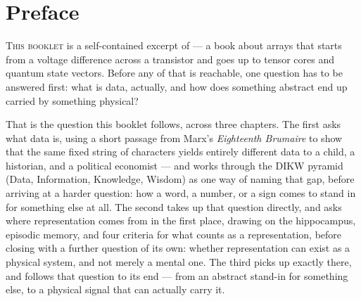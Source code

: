 \chapter*{Preface}

\lettrine{T}{his booklet} is a self-contained excerpt of \BookletSubtitle
--- a book about arrays that starts from a voltage difference across a
transistor and goes up to tensor cores and quantum state vectors. Before
any of that is reachable, one question has to be answered first: what is
data, actually, and how does something abstract end up carried by
something physical?

That is the question this booklet follows, across three chapters. The
first asks what data is, using a short passage from Marx's \textit{Eighteenth
Brumaire} to show that the same fixed string of characters yields entirely
different data to a child, a historian, and a political economist ---
and works through the DIKW pyramid (Data, Information, Knowledge, Wisdom)
as one way of naming that gap, before arriving at a harder question: how
a word, a number, or a sign comes to stand in for something else at all.
The second takes up that question directly, and asks where representation
comes from in the first place, drawing on the hippocampus, episodic
memory, and four criteria for what counts as a representation, before
closing with a further question of its own: whether representation can
exist as a physical system, and not merely a mental one. The third picks
up exactly there, and follows that question to its end --- from an
abstract stand-in for something else, to a physical signal that can
actually carry it.

\vfill

\begin{flushright}
\textit{\BookletAuthor} \\
\textit{\BookletYear}
\end{flushright}
